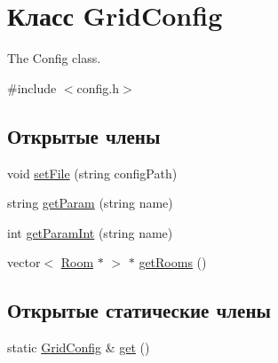 \hypertarget{class_grid_config}{}\section{Класс Grid\+Config}
\label{class_grid_config}


The Config class.  




{\ttfamily \#include $<$config.\+h$>$}

\subsection*{Открытые члены}
\begin{DoxyCompactItemize}
\item 
void \hyperlink{class_grid_config_a06a311c3bc17bebae00cb6573378730f}{set\+File} (string config\+Path)
\item 
string \hyperlink{class_grid_config_a2f3515d56ac52c5da67d1e181808404a}{get\+Param} (string name)
\item 
int \hyperlink{class_grid_config_ac9df22f86cdb7d1c51b2273640aefc99}{get\+Param\+Int} (string name)
\item 
vector$<$ \hyperlink{class_room}{Room} $\ast$ $>$ $\ast$ \hyperlink{class_grid_config_a98f5a1bb1b4fc28cf7b5d1bc931f5a54}{get\+Rooms} ()
\end{DoxyCompactItemize}
\subsection*{Открытые статические члены}
\begin{DoxyCompactItemize}
\item 
static \hyperlink{class_grid_config}{Grid\+Config} \& \hyperlink{class_grid_config_acbe684009967e7b8593c7e3303cdfbf5}{get} ()
\end{DoxyCompactItemize}
